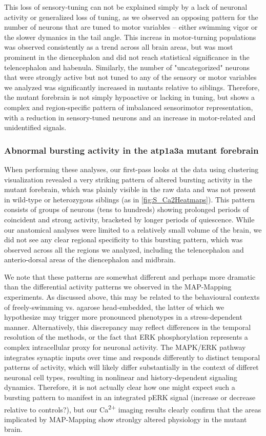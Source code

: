 This loss of sensory-tuning can not be explained simply by a lack of neuronal activity or generalized loss of tuning, as we observed an opposing pattern for the number of neurons that are tuned to motor variables -- either swimming vigor or the slower dymanics in the tail angle. This increas in motor-turning populations was observed consistently as a trend across all brain areas, but was most prominent in the diencephalon and did not reach statistical significance in the telencephalon and habenula. 
Similarly, the number of "uncategorized" neurons that were strongly active but not tuned to any of the sensory or motor variables we analyzed was significantly increased in mutants relative to siblings. 
Therefore, the mutant forebrain is not simply hypoactive or lacking in tuning, but shows a complex and region-specific pattern of imbalanced sensorimotor representation, with a reduction in sensory-tuned neurons and an increase in motor-related and unidentified signals.


\subsubsection{Abnormal bursting activity in the atp1a3a mutant forebrain}
When performing these analyses, our first-pass looks at the data using clustering visualization revealed a very striking pattern of altered bursting activity in the mutant forebrain, which was plainly visible in the raw data and was not present in wild-type or heterozygous siblings (as in \autoref{fig:S_Ca2Heatmaps}). 
This pattern consists of groups of neurons (tens to hundreds) showing prolonged periods of coincident and strong activity, bracketed by longer periods of quiescence.
While our anatomical analyses were limited to a relatively small volume of the brain, we did not see any clear regional specificity to this bursting pattern, which was observed across all the regions we analyzed, including the telencephalon and anterio-dorsal areas of the diencephalon and midbrain.

We note that these patterns are somewhat different and perhaps more dramatic than the differential activity patterns we observed in the MAP-Mapping experiments. 
As discussed above, this may be related to the behavioural contexts of freely-swimming vs. agarose head-embedded, the latter of which we hypothesize may trigger more pronounced phenotypes in a stress-dependent manner. 
Alternatively, this discrepancy may reflect differences in the temporal resolution of the methods, or the fact that ERK phosphorylation represents a complex intracellular proxy for neuronal activity. 
The MAPK/ERK pathway integrates synaptic inputs over time and responds differently to distinct temporal patterns of activity, which will likely differ substantially in the context of differet neuronal cell types, resulting in nonlinear and history-dependent signaling dynamics. 
Therefore, it is not actually clear how one might expect such a bursting pattern to manifest in an integrated pERK signal (increase or decrease relative to controls?), but our Ca\textsuperscript{2+} imaging results clearly confirm that the areas implicated by MAP-Mapping show stronlgy altered physiology in the mutant brain. 

